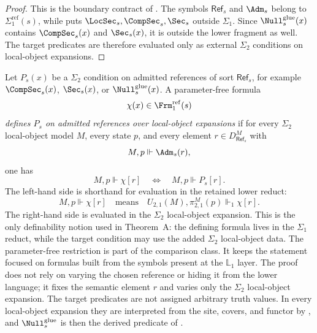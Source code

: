 \begin{proof}
This is the boundary contract of . The symbols $\mathsf{Ref}_s$ and $\Adm_s$ belong to $\Sigma_1^{\mathrm{ref}}(s)$, while  puts $\LocSec_s,\CompSec_s,\Sec_s$ outside $\Sigma_1$. Since $\Null_s^{\mathrm{glue}}(x)$ contains $\CompSec_s(x)$ and $\Sec_s(x)$, it is outside the lower fragment as well. The target predicates are therefore evaluated only as external $\Sigma_2$ conditions on local-object expansions.
\end{proof}

\begin{definition}\label{def:lower-fragment-definability}
Let $P_s(x)$ be a $\Sigma_2$ condition on admitted references of sort $\mathsf{Ref}_s$, for example $\CompSec_s(x)$, $\Sec_s(x)$, or $\Null^{\mathrm{glue}}_s(x)$. A parameter-free formula
\[
\chi(x)\in \Frm_1^{\mathrm{ref}}(s)
\]
\emph{defines $P_s$ on admitted references over local-object expansions} if for every $\Sigma_2$ local-object model $M$, every state $p$, and every element $r\in D_{\mathsf{Ref}_s}^M$ with
\[
M,p\Vdash \Adm_s(r),
\]
one has
\[
M,p\Vdash \chi[r]
\quad\Longleftrightarrow\quad
M,p\Vdash P_s[r].
\]
The left-hand side is shorthand for evaluation in the retained lower reduct:
\[
M,p\Vdash \chi[r]
\quad\text{means}\quad
U_{2,1}(M),\pi^M_{2,1}(p)\Vdash_1 \chi[r].
\]
The right-hand side is evaluated in the $\Sigma_2$ local-object expansion. This is the only definability notion used in Theorem~A: the defining formula lives in the $\Sigma_1$ reduct, while the target condition may use the added $\Sigma_2$ local-object data.
The parameter-free restriction is part of the comparison class. It keeps the statement focused on formulas built from the symbols present at the $\mathbb L_1$ layer. The proof does not rely on varying the chosen reference or hiding it from the lower language; it fixes the semantic element $r$ and varies only the $\Sigma_2$ local-object expansion.
The target predicates are not assigned arbitrary truth values. In every local-object expansion they are interpreted from the site, covers, and functor by , and $\Null_s^{\mathrm{glue}}$ is then the derived predicate of .
\end{definition}

